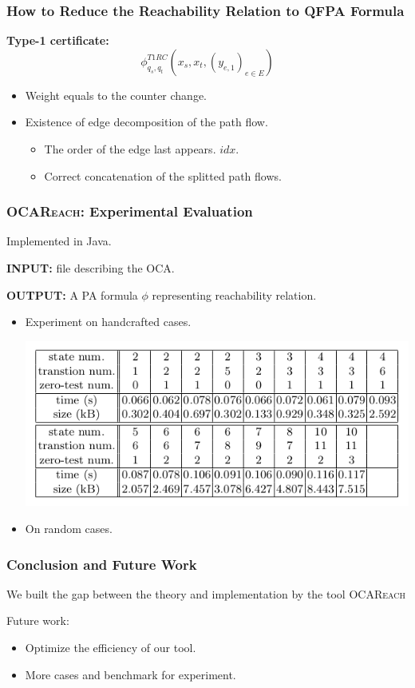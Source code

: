 \documentclass[11pt]{beamer}
\begin{document}
\begin{frame}\frametitle{How to Reduce the Reachability Relation to QFPA Formula}

\textbf{Type-1 certificate:}
\[\phi^{T1RC}_{q_s, q_t}(x_s, x_t, (y_{e,1})_{e\in E}) \]
\begin{itemize}
\item Weight equals to the counter change.
\pause
\item Existence of edge decomposition of the path flow.
\pause
\begin{itemize}
\item The order of the edge last appears. $idx$.
\pause
\item Correct concatenation of the splitted path flows.
\end{itemize}
\end{itemize}
\end{frame}


\begin{frame}\frametitle{\textsc{OCAReach}: Experimental Evaluation}
Implemented in Java.

\textbf{INPUT:} file describing the OCA.

\textbf{OUTPUT:} A PA formula $\phi$ representing reachability relation.
\begin{itemize}
\item Experiment on handcrafted cases.
\begin{center}
\includegraphics[scale=0.4]{expoca.png}
\end{center}
\item On random cases.
\end{itemize}
\end{frame}

\begin{frame}\frametitle{Conclusion and Future Work}
We built the gap between the theory and implementation by the tool \textsc{OCAReach}

Future work:

\begin{itemize}
\item Optimize the efficiency of our tool.

\item More cases and benchmark for experiment.
\end{itemize}
\end{frame}
\end{document}
